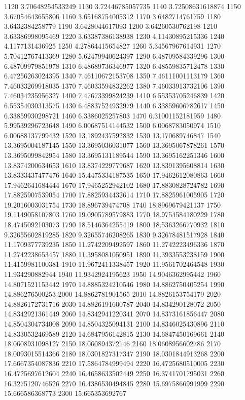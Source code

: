{1120 3.70648254533249
1130 3.72446785057735
1140 3.72508631618874
1150 3.67054643655806
1160 3.65168754005312
1170 3.6482714761759
1180 3.6432384258779
1190 3.6428044617093
1200 3.64260530762198
1210 3.63386998095469
1220 3.63387386138938
1230 4.11430895215336
1240 4.1177131436925
1250 4.27864415654827
1260 5.34567967614931
1270 5.70412767413369
1280 5.62479940624397
1290 6.48709584339296
1300 6.48709979851978
1310 6.48689736346977
1320 6.48559835712478
1330 6.47256263024395
1340 7.46110672153708
1350 7.46111001113179
1360 7.46033269918035
1370 7.46033594832262
1380 7.46033913732106
1390 7.46034235956327
1400 7.47673399824239
1410 6.55353705246839
1420 6.55354030313575
1430 6.48837524932979
1440 6.33859606782617
1450 6.33859930298721
1460 6.3386025257803
1470 6.31001152181959
1480 5.99539296723648
1490 6.00687514144532
1500 6.0068783050974
1510 6.00688137799432
1520 13.1892437592832
1530 13.170689746847
1540 13.3695004187145
1550 13.3695036031077
1560 13.3695067878261
1570 13.3695099842954
1580 13.3695131189544
1590 13.3695162251346
1600 13.8374200634653
1610 13.8374229779687
1620 13.8391395608814
1630 13.8333437477476
1640 15.4475334187535
1650 17.9462612080863
1660 17.9462641684444
1670 17.9465252942102
1680 17.8830828724782
1690 17.8825907539054
1700 17.8825934432614
1710 17.8825961005905
1720 19.2016003031754
1730 18.896739474708
1740 18.8969679421137
1750 19.1149058107803
1760 19.0905789579883
1770 18.9754584180229
1780 18.4745092103073
1790 18.5146364255419
1800 18.5363266770932
1810 9.32655602819285
1820 9.32655746208265
1830 9.32678481517928
1840 11.1709377739235
1850 11.2742209492597
1860 11.2742223496336
1870 11.2742238653457
1880 11.3958081050951
1890 11.3933553238159
1900 11.4159981100381
1910 11.9672411338457
1920 11.9561702464548
1930 11.934290882944
1940 11.9342924195623
1950 14.9046362995442
1960 14.8071521153442
1970 14.8885324210546
1980 14.8862750405254
1990 14.886276500253
2000 14.8862781901565
2010 14.8826153754179
2020 14.8826172731716
2030 14.8826191600787
2040 14.834290128072
2050 14.8342921361449
2060 14.8342941220341
2070 14.8373161856447
2080 14.8504304734008
2090 14.8504325094131
2100 14.8346025430896
2110 14.8330532469589
2120 14.6847956142815
2130 14.6847450169661
2140 18.0608931098127
2150 18.060894372146
2160 18.0608956602786
2170 18.0093015514366
2180 18.0301827317347
2190 18.0301844913268
2200 17.6667354087836
2210 17.5864784999494
2220 16.4725680510005
2230 16.4725697612604
2240 16.4658633502449
2250 16.3741701795031
2260 16.3275120746526
2270 16.4386530494845
2280 15.6975866991999
2290 15.666586368773
2300 15.665353692767
}
